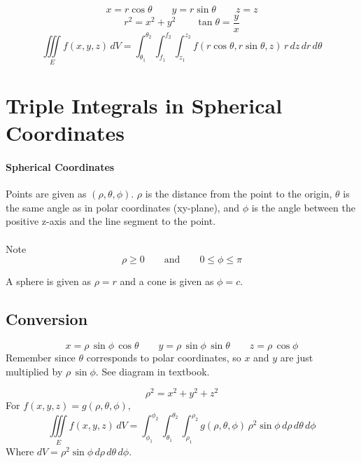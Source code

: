 \documentclass{report}  %
\begin{document}
\begin{equation}
	x = r \cos{\theta} \qquad y = r\sin{\theta} \qquad z = z
\end{equation}
\begin{equation}
	r^2 = x^2 + y^2 \qquad \tan{\theta} = \frac{y}{x}
\end{equation}
\begin{equation}
	\iiint \limits_E f(x, y, z) \, dV = \int_{\theta_1}^{\theta_2} \! \int_{f_1}^{f_2} \! \int_{z_1}^{z_2}
	f(r \cos{\theta}, r\sin{\theta}, z) \, r \, dz \, dr \, d\theta
\end{equation}

\section{Triple Integrals in Spherical Coordinates}
\paragraph{Spherical Coordinates} Points are given as $(\rho, \theta, \phi)$. 
$\rho$ is the distance from the point to the origin, 
$\theta$ is the same angle as in polar coordinates (xy-plane), and
$\phi$ is the angle between the positive z-axis and the line segment to the point. \\ \\
Note $$\rho \ge 0 \qquad \text{and} \qquad 0 \le \phi \le \pi$$

A sphere is given as $\rho = r$ and a cone is given as $\phi = c$. 

\subsection*{Conversion}
\begin{equation}
	x = \rho \, \sin{\phi} \, \cos{\theta} \qquad
	y = \rho \, \sin{\phi} \, \sin{\theta} \qquad
	z = \rho \, \cos{\phi} 
\end{equation}
Remember since $\theta$ corresponds to polar coordinates, so $x$ and $y$ are just multiplied by $\rho \, \sin{\phi}$. 
See diagram in textbook.

\begin{equation}
	\rho^2 = x^2 + y^2 + z^2
\end{equation}
For $f(x, y, z) = g(\rho, \theta, \phi)$,
\begin{equation}
	\iiint \limits_E f(x, y, z) \, dV = 
	\int_{\phi_1}^{\phi_2} \! \int_{\theta_1}^{\theta_2} \! \int_{\rho_1}^{\rho_2} 
	g(\rho, \theta, \phi) \, \rho^2 \sin{\phi} \, d\rho \, d\theta \, d\phi
\end{equation}
Where $dV = \rho^2 \sin{\phi} \, d\rho \, d\theta \, d\phi$.
\end{document}
